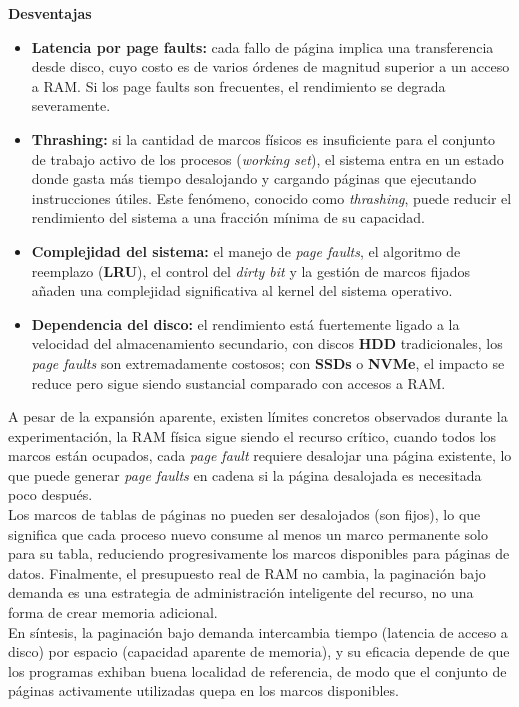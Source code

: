 \documentclass[12pt,letterpaper]{article}
\begin{document}
\textbf{Desventajas}
\begin{itemize}
\item \textbf{Latencia por page faults:} cada fallo de página implica una transferencia desde disco, cuyo costo
  es de varios órdenes de magnitud superior a un acceso a RAM. Si los page faults son frecuentes, el rendimiento
  se degrada severamente.
\item \textbf{Thrashing:} si la cantidad de marcos físicos es insuficiente para el conjunto de trabajo activo de
  los procesos (\textit{working set}), el sistema entra en un estado donde gasta más tiempo desalojando y
  cargando páginas que ejecutando instrucciones útiles. Este fenómeno, conocido como \textit{thrashing}, puede
  reducir el rendimiento del sistema a una fracción mínima de su capacidad.
\item \textbf{Complejidad del sistema:} el manejo de \textit{page faults}, el algoritmo de reemplazo
  (\textbf{LRU}), el control del \textit{dirty bit} y la gestión de marcos fijados añaden una complejidad
  significativa al kernel del sistema operativo.
\item \textbf{Dependencia del disco:} el rendimiento está fuertemente ligado a la velocidad del almacenamiento
  secundario, con discos \textbf{HDD} tradicionales, los \textit{page faults} son extremadamente costosos; con
  \textbf{SSDs} o \textbf{NVMe}, el impacto se reduce pero sigue siendo sustancial comparado con accesos a RAM.
\end{itemize}  

A pesar de la expansión aparente, existen límites concretos observados durante la experimentación, la RAM física
sigue siendo el recurso crítico, cuando todos los marcos están ocupados, cada \textit{page fault} requiere
desalojar una página existente, lo que puede generar \textit{page faults} en cadena si la página desalojada es
necesitada poco después.\\

Los marcos de tablas de páginas no pueden ser desalojados (son fijos), lo que significa que cada proceso nuevo
consume al menos un marco permanente solo para su tabla, reduciendo progresivamente los marcos disponibles para
páginas de datos. Finalmente, el presupuesto real de RAM no cambia, la paginación bajo demanda es una estrategia
de administración inteligente del recurso, no una forma de crear memoria adicional.\\

En síntesis, la paginación bajo demanda intercambia tiempo (latencia de acceso a disco) por espacio (capacidad
aparente de memoria), y su eficacia depende de que los programas exhiban buena localidad de referencia, de modo
que el conjunto de páginas activamente utilizadas quepa en los marcos disponibles.
\end{document}
